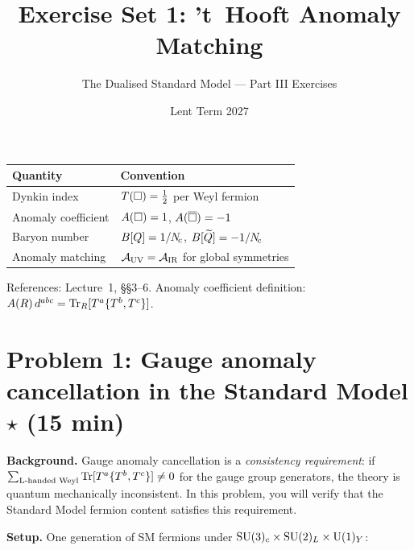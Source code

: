\documentclass[11pt,a4paper]{article}
\title{\textbf{Exercise Set 1: 't~Hooft Anomaly Matching}}
\author{The Dualised Standard Model --- Part III Exercises}
\date{Lent Term 2027}
\begin{document}
\maketitle

\begin{conventionbox}[title={Conventions for these exercises}]
\renewcommand{\arraystretch}{1.3}
\begin{tabular}{@{}l l@{}}
\toprule
\textbf{Quantity} & \textbf{Convention} \\
\midrule
Dynkin index & $T(\square) = \tfrac{1}{2}$ per Weyl fermion \\
Anomaly coefficient & $A(\square) = 1$, $A(\overline{\square}) = -1$ \\
Baryon number & $B[Q] = 1/N_{\!c}$, $B[\widetilde{Q}] = -1/N_{\!c}$ \\
Anomaly matching & $\mathcal{A}_{\mathrm{UV}} = \mathcal{A}_{\mathrm{IR}}$ for global symmetries \\
\bottomrule
\end{tabular}

\medskip

\noindent References: Lecture~1, \S\S3--6.
Anomaly coefficient definition: $A(R)\,d^{abc} = \mathrm{Tr}_R[T^a\{T^b,T^c\}]$.
\end{conventionbox}

\bigskip

\section*{Problem 1: Gauge anomaly cancellation in the Standard Model \hfill $\star$ \normalsize(15 min)}
\label{prob:sm-anomaly}

\noindent\textbf{Background.}
Gauge anomaly cancellation is a \emph{consistency requirement}: if
$\sum_{\text{L-handed Weyl}} \mathrm{Tr}[T^a\{T^b, T^c\}] \neq 0$ for the gauge
group generators, the theory is quantum mechanically inconsistent.
In this problem, you will verify that the Standard Model fermion content
satisfies this requirement.

\medskip
\noindent\textbf{Setup.}
One generation of SM fermions under $\mathrm{SU}(3)_c \times \mathrm{SU}(2)_L \times \mathrm{U}(1)_Y$:
\end{document}
